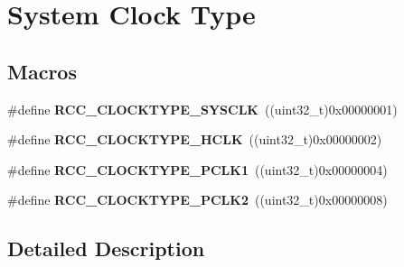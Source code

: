 \hypertarget{group___r_c_c___system___clock___type}{}\section{System Clock Type}
\label{group___r_c_c___system___clock___type}
\subsection*{Macros}
\begin{DoxyCompactItemize}
\item 
\#define {\bfseries R\+C\+C\+\_\+\+C\+L\+O\+C\+K\+T\+Y\+P\+E\+\_\+\+S\+Y\+S\+C\+LK}~((uint32\+\_\+t)0x00000001)\hypertarget{group___r_c_c___system___clock___type_ga7e721f5bf3fe925f78dae0356165332e}{}\label{group___r_c_c___system___clock___type_ga7e721f5bf3fe925f78dae0356165332e}

\item 
\#define {\bfseries R\+C\+C\+\_\+\+C\+L\+O\+C\+K\+T\+Y\+P\+E\+\_\+\+H\+C\+LK}~((uint32\+\_\+t)0x00000002)\hypertarget{group___r_c_c___system___clock___type_gaa5330efbd790632856a2b15851517ef9}{}\label{group___r_c_c___system___clock___type_gaa5330efbd790632856a2b15851517ef9}

\item 
\#define {\bfseries R\+C\+C\+\_\+\+C\+L\+O\+C\+K\+T\+Y\+P\+E\+\_\+\+P\+C\+L\+K1}~((uint32\+\_\+t)0x00000004)\hypertarget{group___r_c_c___system___clock___type_gab00c7b70f0770a616be4b5df45a454c4}{}\label{group___r_c_c___system___clock___type_gab00c7b70f0770a616be4b5df45a454c4}

\item 
\#define {\bfseries R\+C\+C\+\_\+\+C\+L\+O\+C\+K\+T\+Y\+P\+E\+\_\+\+P\+C\+L\+K2}~((uint32\+\_\+t)0x00000008)\hypertarget{group___r_c_c___system___clock___type_gaef7e78706e597a6551d71f5f9ad60cc0}{}\label{group___r_c_c___system___clock___type_gaef7e78706e597a6551d71f5f9ad60cc0}

\end{DoxyCompactItemize}


\subsection{Detailed Description}
